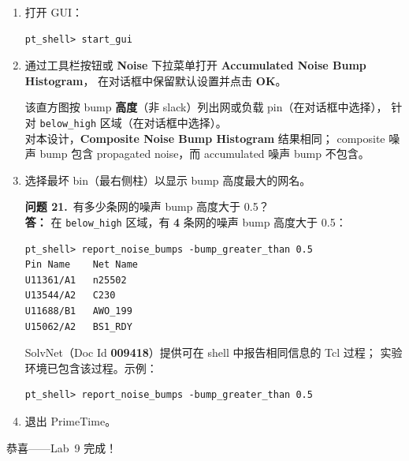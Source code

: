 \begin{enumerate}
  \item 打开 GUI：
\begin{lstlisting}
pt_shell> start_gui
\end{lstlisting}

  \item 通过工具栏按钮或 \textbf{Noise} 下拉菜单打开 \textbf{Accumulated Noise Bump Histogram}，
        在对话框中保留默认设置并点击 \textbf{OK}。

\begin{noteBox}
该直方图按 bump \textbf{高度}（非 slack）列出网或负载 pin（在对话框中选择），
针对 \texttt{below\_high} 区域（在对话框中选择）。\\
对本设计，\textbf{Composite Noise Bump Histogram} 结果相同；
composite 噪声 bump 包含 propagated noise，而 accumulated 噪声 bump 不包含。
\end{noteBox}

  \item 选择最坏 bin（最右侧柱）以显示 bump 高度最大的网名。

\begin{questionBox}
\textbf{问题 21.}\ 有多少条网的噪声 bump 高度大于 0.5？\\[0.35em]
\textbf{答：} 在 \texttt{below\_high} 区域，有 \textbf{4} 条网的噪声 bump 高度大于 0.5：
\begin{lstlisting}
pt_shell> report_noise_bumps -bump_greater_than 0.5
Pin Name    Net Name
U11361/A1   n25502
U13544/A2   C230
U11688/B1   AWO_199
U15062/A2   BS1_RDY
\end{lstlisting}
\end{questionBox}

\begin{noteBox}
SolvNet（Doc Id \textbf{009418}）提供可在 shell 中报告相同信息的 Tcl 过程；
实验环境已包含该过程。示例：
\begin{lstlisting}
pt_shell> report_noise_bumps -bump_greater_than 0.5
\end{lstlisting}
\end{noteBox}

  \item 退出 PrimeTime。
\end{enumerate}

\noindent 恭喜——Lab~9 完成！
